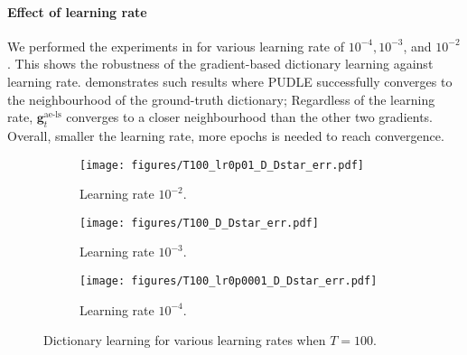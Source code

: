 \documentclass[10pt]{article} %
\newcommand{\g}{{\bm g}}
\begin{document}
\paragraph{Effect of learning rate} We performed the experiments in  for various learning rate of $10^{-4}, 10^{-3}$, and $10^{-2}$. This shows the robustness of the gradient-based dictionary learning against learning rate.  demonstrates such results where PUDLE successfully converges to the neighbourhood of the ground-truth dictionary; Regardless of the learning rate, $\g_t^{\text{ae-ls}}$ converges to a closer neighbourhood than the other two gradients. Overall, smaller the learning rate, more epochs is needed to reach convergence.
\begin{figure}[h]
	\centering
	\begin{subfigure}[t]{0.28\linewidth}
	\centering
	\texttt{[image: figures/T100\_lr0p01\_D\_Dstar\_err.pdf]}
	  \caption{Learning rate $10^{-2}$.}
  	\label{fig:dl_100_lr2}
	\end{subfigure}
	\begin{subfigure}[t]{0.28\linewidth}
	\centering
	\texttt{[image: figures/T100\_D\_Dstar\_err.pdf]}
	  \caption{Learning rate $10^{-3}$.}
  	\label{fig:dl_100_lr3}
	\end{subfigure}
	\begin{subfigure}[t]{0.28\linewidth}
	\centering
	\texttt{[image: figures/T100\_lr0p0001\_D\_Dstar\_err.pdf]}
	  \caption{Learning rate $10^{-4}$.}
  	\label{fig:dl_100_lr4}
	\end{subfigure}
    \caption{Dictionary learning for various learning rates when $T=100$.}
	\label{fig:dl_lr}
	\vspace{-7mm}
\end{figure}
%
\end{document}
